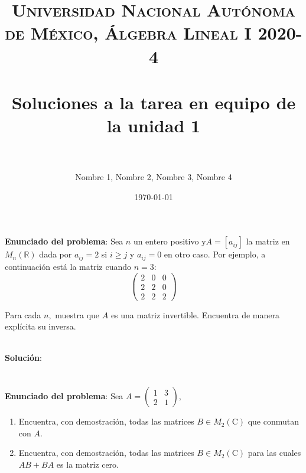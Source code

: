 \documentclass{article} %
\title{	
\normalfont \normalsize 
\textsc{Universidad Nacional Autónoma de México, Álgebra Lineal I 2020-4} \\ %
\horrule{0.5pt} \\[0.4cm] %
\huge Soluciones a la tarea en equipo de la unidad 1 \\ %
\horrule{2pt} \\[0.5cm] %
}
\author{Nombre 1, Nombre 2, Nombre 3, Nombre 4} %
\date{\normalsize\today} %
\begin{document}
\maketitle %

\section{}

\textbf{Enunciado del problema}: Sea $n$ un entero positivo $\mathrm{y} A=\left[a_{i j}\right]$ la matriz en $M_{n}(\mathbb{R})$ dada por $a_{i j}=2$ si $i \geq j$ y $a_{i j}=0$ en otro caso. Por ejemplo, a continuación está la matriz cuando $n=3$:
$$
\left(\begin{array}{lll}
2 & 0 & 0 \\
2 & 2 & 0 \\
2 & 2 & 2
\end{array}\right)
$$

Para cada $n,$ muestra que $A$ es una matriz invertible. Encuentra de manera explícita su inversa.

\\
\vspace{10 mm}
\textbf{Solución}:


				

\section{}

\textbf{Enunciado del problema}: Sea $A=\left(\begin{array}{ll}
1 & 3 \\
2 & 1
\end{array}\right)$, 
\begin{enumerate}[label=(\alph*)]
\item Encuentra, con demostración, todas las matrices $B \in M_{2}(\mathrm{C})$ que conmutan con $A$.
\item Encuentra, con demostración, todas las matrices $B \in M_{2}(\mathrm{C})$ para las cuales $A B+B A$ es la matriz cero.
\end{enumerate}
\end{document}

